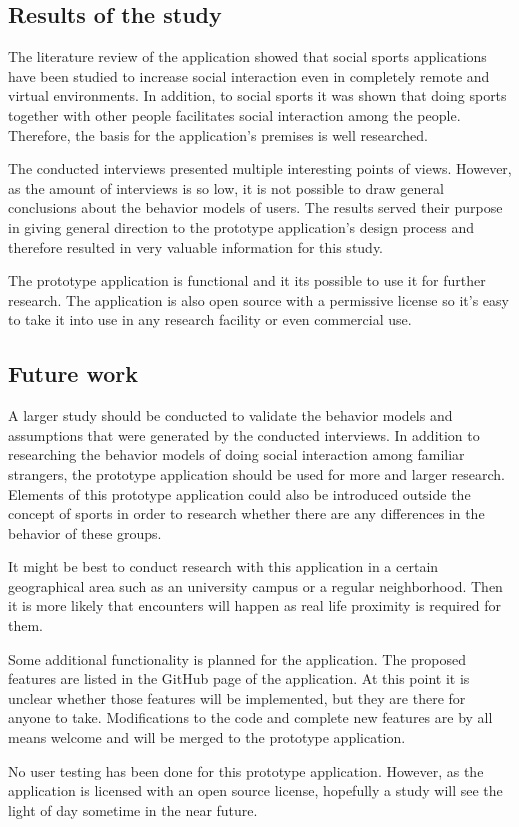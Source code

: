 \subsection{Results of the study}

The literature review of the application showed that social sports applications have been studied to increase social interaction even in completely remote and virtual environments. In addition, to social sports it was shown that doing sports together with other people facilitates social interaction among the people. Therefore, the basis for the application's premises is well researched.

The conducted interviews presented multiple interesting points of views. However, as the amount of interviews is so low, it is not possible to draw general conclusions about the behavior models of users. The results served their purpose in giving general direction to the prototype application's design process and therefore resulted in very valuable information for this study.

The prototype application is functional and it its possible to use it for further research. The application is also open source with a permissive license so it's easy to take it into use in any research facility or even commercial use.

\subsection{Future work}

A larger study should be conducted to validate the behavior models and assumptions that were generated by the conducted interviews. In addition to researching the behavior models of doing social interaction among familiar strangers, the prototype application should be used for more and larger research. Elements of this prototype application could also be introduced outside the concept of sports in order to research whether there are any differences in the behavior of these groups.

It might be best to conduct research with this application in a certain geographical area such as an university campus or a regular neighborhood. Then it is more likely that encounters will happen as real life proximity is required for them.

Some additional functionality is planned for the application. The proposed features are listed in the GitHub page of the application. At this point it is unclear whether those features will be implemented, but they are there for anyone to take. Modifications to the code and complete new features are by all means welcome and will be merged to the prototype application.

No user testing has been done for this prototype application. However, as the application is licensed with an open source license, hopefully a study will see the light of day sometime in the near future.

